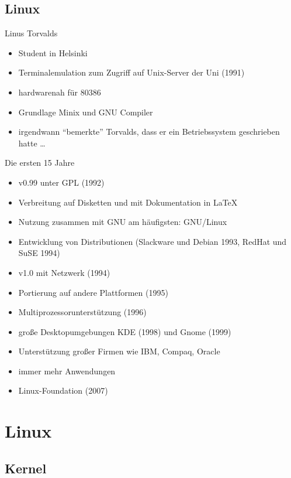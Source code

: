 \documentclass{beamer}
\begin{document}
\subsection{Linux}

\begin{frame}{Linus Torvalds}
    \begin{itemize}
        \item Student in Helsinki
        \item Terminalemulation zum Zugriff auf Unix-Server der Uni (1991)
        \item hardwarenah für 80386
        \item Grundlage Minix und GNU Compiler
        \pause
        \item irgendwann \enquote{bemerkte} Torvalds, dass er ein
            Betriebssystem geschrieben hatte …
    \end{itemize}
\end{frame}

\begin{frame}{Die ersten 15 Jahre}
    \begin{itemize}
        \item v0.99 unter GPL (1992)
        \item Verbreitung auf Disketten und mit Dokumentation in \LaTeX
        \item Nutzung zusammen mit GNU am häufigsten: GNU/Linux
        \item Entwicklung von Distributionen (Slackware und Debian 1993, RedHat und SuSE 1994)
        \item v1.0 mit Netzwerk (1994)
        \item Portierung auf andere Plattformen (1995)
        \item Multiprozessorunterstützung (1996)
        \item große Desktopumgebungen KDE (1998) und Gnome (1999)
        \item Unterstützung großer Firmen wie IBM, Compaq, Oracle
        \item immer mehr Anwendungen
        \item Linux-Foundation (2007)
    \end{itemize}
\end{frame}

\section{Linux}

\subsection{Kernel}
\end{document}
